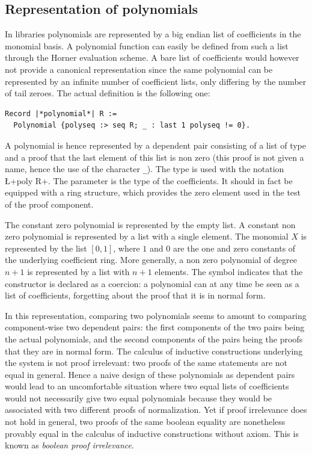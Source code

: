 \documentclass{mscs}
\begin{document}
\subsection{Representation of polynomials}\label{ssec:polys}
In \ssr{} libraries 
polynomials are represented by a big endian list of coefficients in
the monomial basis. A polynomial function can easily be defined from
such a list through the Horner evaluation scheme.
A bare list of coefficients would however not
provide a canonical representation since the same
polynomial can be represented by an infinite number of coefficient
lists, only differing by the number of tail zeroes. The actual
definition is the following one:
\begin{lstlisting}
Record |*polynomial*| R :=
  Polynomial {polyseq :> seq R; _ : last 1 polyseq != 0}.
\end{lstlisting}
A polynomial is hence
represented by a dependent pair consisting of a list  of
type  and a
proof that the last element of this list is non zero (this proof is
not given a name, hence the use of the character {\tt \_}). The type
 is used with the notation \L+{poly R}+. The
parameter  is the type of the coefficients. It should in fact
be equipped with a ring structure, which provides the zero element
used in the test of the proof component.

The constant zero polynomial is represented by the empty list. A
constant non zero polynomial is represented by a list with a single
element. The monomial $X$ is represented
by the list $[0, 1]$, where $1$ and $0$ are the one and zero
constants of the underlying coefficient ring.
More generally, a non zero polynomial of degree $n+1$ is
represented by a list with $n+1$ elements. The \C{:>} symbol indicates
that the  constructor is declared as a coercion: a
polynomial can at any time be seen as a list of coefficients,
forgetting about the proof that it is in normal form.

In this representation, comparing two polynomials seems to
amount to comparing component-wise two dependent pairs: the first
components of
the two pairs being the actual polynomials, and the second components
of the pairs being the proofs that they are in normal form.  The calculus of
inductive constructions underlying the \Coq{} system is not proof
irrelevant: two proofs of the same statements are not equal in
general. Hence a naive design of these polynomials as dependent pairs
would lead to an uncomfortable situation where two equal lists of
coefficients would not necessarily give two equal polynomials because
they would be associated with two different proofs of normalization. Yet if
proof irrelevance does not hold in general, two proofs of the same
boolean equality are nonetheless provably equal in the calculus of
inductive constructions without axiom.  This is known as {\em boolean
  proof irrelevance}.
\end{document}

